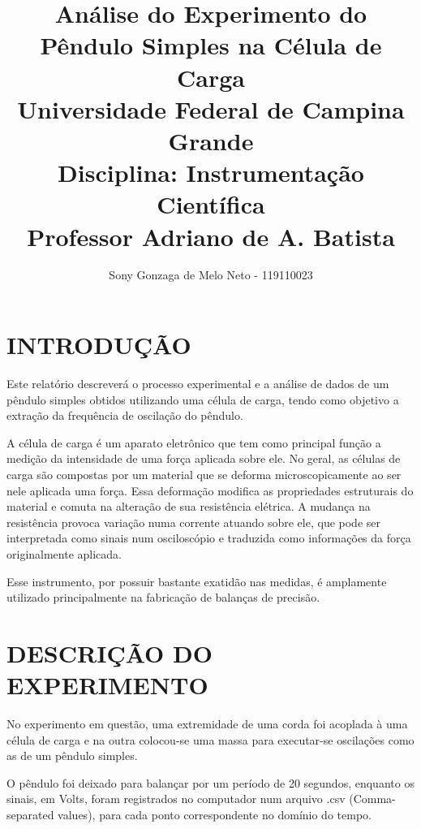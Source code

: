\documentclass[10pt,a4paper,twocolumn]{article}
\author{Sony Gonzaga de Melo Neto - 119110023}
\title{Análise do Experimento do Pêndulo Simples na Célula de Carga \\
 \large Universidade Federal de Campina Grande \\
  Disciplina: Instrumentação Científica \\
  Professor Adriano de A. Batista}
\begin{document}
\maketitle
\section{INTRODUÇÃO}
\par Este relatório descreverá o processo experimental e a análise de dados de um pêndulo simples obtidos utilizando uma célula de carga, tendo como objetivo a extração da frequência de oscilação do pêndulo.
\par A célula de carga é um aparato eletrônico que tem como principal função a medição da intensidade de uma força aplicada sobre ele. No geral, as células de carga são compostas por um material que se deforma microscopicamente ao ser nele aplicada uma força. Essa deformação modifica as propriedades estruturais do material e comuta na alteração de sua resistência elétrica. A mudança na resistência provoca variação numa corrente atuando sobre ele, que pode ser interpretada como sinais num osciloscópio e traduzida como informações da força originalmente aplicada.
\par Esse instrumento, por possuir bastante exatidão nas medidas, é amplamente utilizado principalmente na fabricação de balanças de precisão.
\section{DESCRIÇÃO DO EXPERIMENTO}
\par No experimento em questão, uma extremidade de uma corda foi acoplada à uma célula de carga e na outra colocou-se uma massa para executar-se oscilações como as de um pêndulo simples. 
\par O pêndulo foi deixado para balançar por um período de 20 segundos, enquanto os sinais, em Volts, foram registrados no computador num arquivo .csv (Comma-separated values), para cada ponto correspondente no domínio do tempo.
\end{document}
